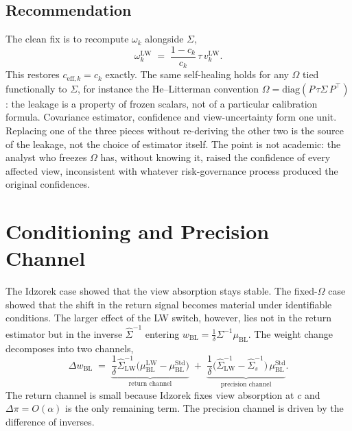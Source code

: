 \documentclass[a4paper,11pt]{article}
\theoremstyle{plain}
\theoremstyle{definition}
\newcommand{\Std}{\mathrm{Std}}
\newcommand{\LW}{\mathrm{LW}}
\newcommand{\eff}{\mathrm{eff}}
\begin{document}
\subsection{Recommendation}
\label{sec:rec}

The clean fix is to recompute $\omega_k$ alongside $\Sigma$,
\[
  \omega_k^{\LW} \;=\; \frac{1-c_k}{c_k}\,\tau\,v_k^{\LW}.
\]
This restores $c_{\eff,k} = c_k$ exactly. The same self-healing holds
for any $\Omega$ tied functionally to $\Sigma$, for instance the
He--Litterman convention $\Omega = \mathrm{diag}(P\,\tau\Sigma\,P^\top)$:
the leakage is a property of frozen scalars, not of a particular
calibration formula. Covariance estimator, confidence and
view-uncertainty form one unit. Replacing one of the three pieces
without re-deriving the other two is the source of the leakage, not the
choice of estimator itself. The point is not academic: the analyst who
freezes $\Omega$ has, without knowing it, raised the confidence of every
affected view, inconsistent with whatever risk-governance process
produced the original confidences.

\section{Conditioning and Precision Channel}
\label{sec:precision}

The Idzorek case showed that the view absorption stays stable. The
fixed-$\Omega$ case showed that the shift in the return signal becomes
material under identifiable conditions. The larger effect of the LW
switch, however, lies not in the return estimator but in the inverse
$\hat\Sigma^{-1}$ entering
$w_{\mathrm{BL}} = \frac{1}{\delta}\Sigma^{-1}\mu_{\mathrm{BL}}$. The
weight change decomposes into two channels,
\[
    \Delta w_{\mathrm{BL}}
    \;=\; \underbrace{\frac{1}{\delta}\hat{\Sigma}_{\LW}^{-1}
          \bigl(\mu_{\mathrm{BL}}^{\LW} - \mu_{\mathrm{BL}}^{\Std}\bigr)
         }_{\text{return channel}}
    \;+\; \underbrace{\frac{1}{\delta}
          \bigl(\hat{\Sigma}_{\LW}^{-1} - \hat{\Sigma}_s^{-1}\bigr)\,
          \mu_{\mathrm{BL}}^{\Std}
         }_{\text{precision channel}}.
\]
The return channel is small because Idzorek fixes view absorption at $c$
and $\Delta\pi = O(\alpha)$ is the only remaining term. The precision
channel is driven by the difference of inverses.
\end{document}
